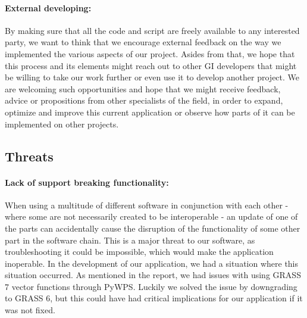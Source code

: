 \paragraph{External developing:} By making sure that all the code and script are freely available to any interested party, we want to think that we encourage external feedback on the way we implemented the various aspects of our project. Asides from that, we hope that this process and its elements might reach out to other GI developers that might be willing to take our work further or even use it to develop another project. We are welcoming such opportunities and hope that we might receive feedback, advice or propositions from other specialists of the field, in order to expand, optimize and improve this current application or observe how parts of it can be implemented on other projects.

\subsection{Threats}
\paragraph{Lack of support breaking functionality:} When using a multitude of different software in conjunction with each other - where some are not necessarily created to be interoperable - an update of one of the parts can accidentally cause the disruption of the functionality of some other part in the software chain. This is a major threat to our software, as troubleshooting it could be impossible, which would make the application inoperable. In the development of our application, we had a situation where this situation occurred. As mentioned in the report, we had issues with using GRASS 7 vector functions through PyWPS. Luckily we solved the issue by downgrading to GRASS 6, but this could have had critical implications for our application if it was not fixed. 